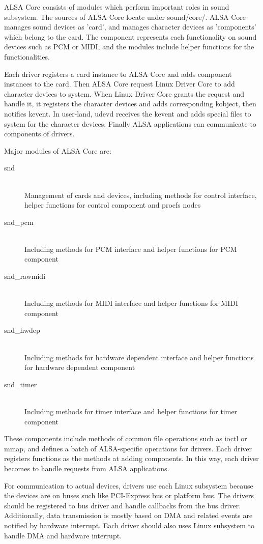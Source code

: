 \documentclass[onecolumn]{article}
\begin{document}
ALSA Core consists of modules which perform important roles in sound subsystem. The sources of ALSA Core locate under sound/core/. ALSA Core manages sound devices as 'card', and manages character devices as 'components' which belong to the card. The component represents each functionality on sound devices such as PCM or MIDI, and the modules include helper functions for the functionalities.

Each driver registers a card instance to ALSA Core and adds component instances to the card. Then ALSA Core request Linux Driver Core to add character devices to system. When Linux Driver Core grants the request and handle it, it registers the character devices and adds corresponding kobject, then notifies kevent. In user-land, udevd receives the kevent and adds special files to system for the character devices. Finally ALSA applications can communicate to components of drivers.

Major modules of ALSA Core are:

\begin{description}
\item[snd] \mbox{} \\
Management of cards and devices, including methods for control interface, helper functions for control component and procfs nodes
\item[snd\_pcm] \mbox{} \\
Including methods for PCM interface and helper functions for PCM component
\item[snd\_rawmidi] \mbox{} \\
Including methods for MIDI interface and helper functions for MIDI component
\item[snd\_hwdep] \mbox{} \\
Including methods for hardware dependent interface and helper functions for hardware dependent component
\item[snd\_timer] \mbox{} \\
Including methods for timer interface and helper functions for timer component
\end{description}

These components include methods of common file operations such as ioctl or mmap, and defines a batch of ALSA-specific operations for drivers. Each driver registers functions as the methods at adding components. In this way, each driver becomes to handle requests from ALSA applications\cite{alsa-driver}.

For communication to actual devices, drivers use each Linux subsystem because the devices are on buses such like PCI-Express bus or platform bus. The drivers should be registered to bus driver and handle callbacks from the bus driver. Additionally, data transmission is mostly based on DMA and related events are notified by hardware interrupt. Each driver should also uses Linux subsystem to handle DMA and hardware interrupt.
\end{document}
